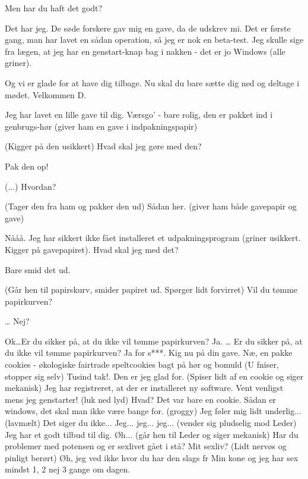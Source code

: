 \documentclass[a4paper,11pt]{article}
\begin{document}
\begin{sketch}
 Men har du haft det godt?

 Det har jeg. De søde forskere gav mig en  gave, da de udskrev mi. Det er første gang, man har lavet en sådan operation, så jeg er nok en beta-test. Jeg skulle sige fra lægen, at jeg har en genstart-knap bag i nakken - det er jo Windows (alle griner).

 Og vi er glade for at have dig tilbage. Nu skal du bare sætte dig ned og deltage i mødet. Velkommen D.

 Jeg har lavet en lille gave til dig. Værsgo’ - bare rolig, den er pakket ind i genbrugs-hør (giver ham en gave i indpakningspapir)

 (Kigger på den usikkert) Hvad skal jeg gøre med den?

 Pak den op!

 (...) Hvordan?

 (Tager den fra ham og pakker den ud) Sådan her. (giver ham både gavepapir og gave)

 Nååå. Jeg har sikkert ikke fået installeret et udpakningsprogram (griner usikkert. Kigger på gavepapiret). Hvad skal jeg med det?

 Bare smid det ud.

(Går hen til papirskurv, smider papiret ud. Spørger lidt forvirret) Vil du tømme papirkurven?

… Nej?

Ok…Er du sikker på, at du ikke vil tømme papirkurven?
Ja.
… Er du sikker på, at du ikke vil tømme papirkurven?
 Ja for s***. Kig nu på din gave.
 Næ, en pakke cookies - økologiske fairtrade speltcookies bagt på hør og bomuld (U fniser, stopper sig selv) Tusind tak!. Den er jeg glad for. (Spiser lidt af en cookie og siger mekanisk) Jeg har registreret, at der er installeret ny software. Vent venligst mens jeg genstarter! (luk ned lyd)
Hvad? Det var bare en cookie.
 Sådan er windows, det skal man ikke være bange for.
 (groggy) Jeg føler mig lidt underlig...
 (lavmælt) Det siger du ikke...
 Jeg... jeg... jeg... (vender sig pludselig mod Leder) Jeg har et godt tilbud til dig.
 Øh...
 (går hen til Leder og siger mekanisk) Har du problemer med potensen og er sexlivet gået i stå?
 Mit sexliv? (Lidt nervøs og pinligt berørt) Øh, jeg ved ikke hvor du har den slags fr Min kone og jeg har sex mindst 1, 2 nej 3 gange om dagen.


\end{sketch}
\end{document}
